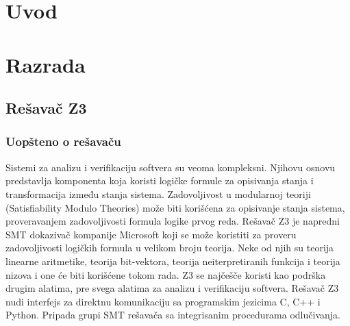 \documentclass[12pt,oneside]{memoir}
\begin{document}
\frontmatter
\naslovna
\komisija
\apstrakt
\tableofcontents*

\mainmatter

\chapter{Uvod}


\chapter{Razrada}
\label{chp:razrada}
\section{Rešavač Z3}

\subsection{Uopšteno o rešavaču}
Sistemi za analizu i verifikaciju softvera su veoma kompleksni. Njihovu osnovu predstavlja komponenta koja koristi logičke formule za opisivanja stanja i transformacija između stanja sistema. Zadovoljivost u modularnoj teoriji (Satisfiability Modulo Theories) može biti korišćena za opisivanje stanja sistema, proveravanjem zadovoljivosti formula logike prvog reda. Rešavač Z3 je napredni SMT dokazivač kompanije Microsoft koji se može koristiti za proveru zadovoljivosti logičkih formula u velikom broju teorija. Neke od njih su teorija linearne aritmetike, teorija bit-vektora, teorija neiterpretiranih funkcija i teorija nizova i one će biti korišćene tokom rada. Z3 se najčešče koristi kao podrška drugim alatima, pre svega alatima za analizu i verifikaciju softvera. Rešavač Z3 nudi interfejs za direktnu komunikaciju sa programskim jezicima C, C++ i Python. Pripada grupi SMT rešavača sa integrisanim procedurama odlučivanja.
\\
\end{document}
